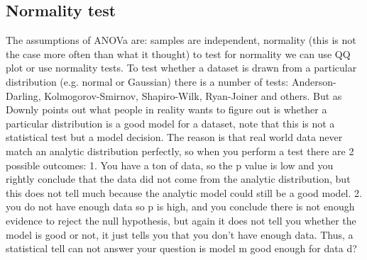 \documentclass[11pt]{article}
\theoremstyle{definition}
\theoremstyle{remark}
\begin{document}




\subsection{Normality test}
\label{sse:normal}
The assumptions of ANOVa are: samples are independent, normality (this is not the case more often than what it thought) to test for normality we can use QQ plot or use normality tests. To test whether a dataset is drawn from a particular distribution (e.g. normal or Gaussian) there is a number of tests: Anderson-Darling, Kolmogorov-Smirnov, Shapiro-Wilk, Ryan-Joiner and others. 
But as Downly points out what people in reality wants to figure out is whether a particular distribution is a good model for a dataset, note that this  is not a statistical test but a model decision. The reason is that real world data never match an analytic distribution perfectly, so when you perform a test there are 2 possible outcomes:
1. You have a ton of data, so the p value is low and you rightly conclude that the data did not come from the analytic distribution, but this does not tell much because the analytic model could still be a good model. 2. you do not have enough data so p is high, and you conclude there is not enough evidence to reject the null hypothesis, but again it does not tell you whether the model is good or not, it just tells you that you don't have enough data. Thus, a statistical tell can not answer your question is model m good enough for data d?
\end{document}
